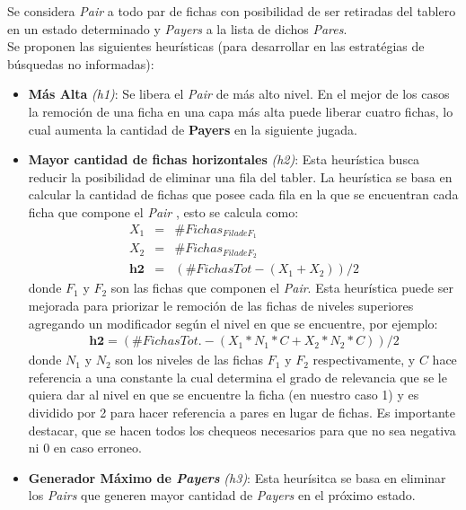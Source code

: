 \documentclass{sig-alternate}
\begin{document}
	Se considera \textit{Pair} a todo par de fichas con posibilidad de ser retiradas del tablero en un estado determinado y \textit{Payers} a la lista de dichos \textit{Pares}. \\
	Se proponen las siguientes heur\'isticas (para desarrollar en las estrat\'egias de b\'usquedas no informadas):
	\begin{itemize}

		\item \textbf{M\'as Alta} \textit{(h1)}: Se libera el \textit{Pair} de m\'as alto nivel. En el mejor de los casos la remoci\'on de una ficha en una capa m\'as alta puede liberar cuatro fichas, lo cual aumenta la cantidad de \textbf{Payers} en la siguiente jugada.
		
		\item \textbf{Mayor cantidad de fichas horizontales} \textit{(h2)}: Esta heur\'istica busca reducir la posibilidad de eliminar una fila del tabler. La heur\'istica se basa en calcular la cantidad de fichas que posee cada fila en la que se encuentran cada ficha que compone el \textit{Pair} , esto se calcula como:
			\begin{eqnarray}
				X_{1}  & = & \# Fichas_{Fila de F_{1}} \\
				X_{2}  & = & \# Fichas_{Fila de F_{2}} \\
				\textbf{h2} & = & (\#FichasTot - ( X_{1} + X_{2} )) / 2
			\end{eqnarray}
		donde $F_{1}$ y $F_{2}$ son las fichas que componen el \textit{Pair}. Esta heur\'istica puede ser mejorada para priorizar le remoci\'on de las fichas de niveles superiores agregando un modificador seg\'un el nivel en que se encuentre, por ejemplo:
			\begin{eqnarray}
				\textbf{h2}  = (\#FichasTot. - ( X_{1} * N_{1} * C + X_{2} * N_{2} * C) )/ 2
			\end{eqnarray}
				donde $N_{1}$ y $N_{2}$ son los niveles de las fichas $F_{1}$ y $F_{2}$ respectivamente, y $C$ hace referencia a una constante la cual determina el grado de relevancia que se le quiera dar al nivel en que se encuentre la ficha (en nuestro caso 1) y es dividido por 2 para hacer referencia a pares en lugar de fichas. Es importante destacar, que se hacen todos los chequeos necesarios para que no sea negativa ni $0$ en caso erroneo.
		
		\item \textbf{Generador M\'aximo de \textit{Payers}} \textit{(h3)}: Esta heur\'isitca se basa en eliminar los \textit{Pairs} que generen mayor cantidad de \textit{Payers} en el pr\'oximo estado.
		
	\end{itemize}
	
\end{document}
